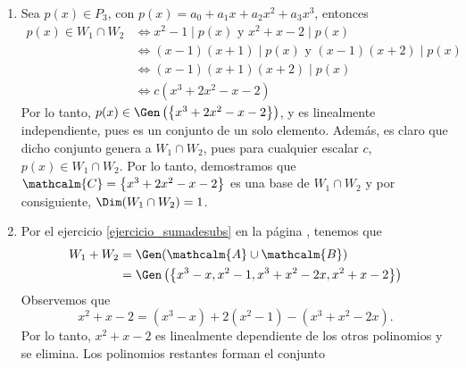 \begin{examplebox}{}{}
\begin{enumerate}[label=\alph*), topsep=6pt, itemsep=0pt]
\begin{align*}
            & \Longleftrightarrow p(x) = \left( x^2 + x - 2 \right) (ax + b) \\
            & \Longleftrightarrow p(x) = a\left( x^3 + x^2 - 2x \right) + b\left( x^2 + x - 2 \right)
        \end{align*}
        Por lo tanto, $p(x) \in \Gen \left(\left\{ x^3 + x^2 - 2x, x^2 + x - 2 \right\}\right)$, y como no existe un escalar $c$ tal que $x^3 + x^2 - 2x = c \left( x^2 + x - 2 \right)$, entonces el conjunto $\left\{ x^3 + x^2 - 2x, x^2 + x - 2 \right\}$ es linealmente independiente. Además, es claro que dicho conjunto genera a $W_2$, pues para cualquier $a$ y $b$, $p(x) \in W_2$. Por lo tanto, demostramos que $\mathcalm{B} = \left\{ x^3 + x^2 - 2x, x^2 + x - 2 \right\}$ es una base para $W_2$ y por consiguiente, tenemos que $\Dim W_2 = 2$.
        \item Sea $p(x) \in P_3$, con $p(x) = a_0 + a_1x + a_2x^2 + a_3x^3$, entonces
        \begin{align*}
            p(x) \in W_1 \cap W_2 & \Longleftrightarrow x^2 - 1 \mid p(x) \text{ y } x^2 + x - 2 \mid p(x) \\
            & \Longleftrightarrow (x - 1)(x + 1) \mid p(x) \text{ y } (x - 1)(x + 2) \mid p(x) \\
            & \Longleftrightarrow (x - 1)(x + 1)(x + 2) \mid p(x) \\
            & \Longleftrightarrow c \left( x^3 + 2x^2 - x - 2 \right)
        \end{align*}
        Por lo tanto, $p(x) \in \Gen \left(\left\{ x^3 + 2x^2 - x - 2 \right\}\right)$, y es linealmente independiente, pues es un conjunto de un solo elemento. Además, es claro que dicho conjunto genera a $W_1 \cap W_2$, pues para cualquier escalar $c$, $p(x) \in W_1 \cap W_2$. Por lo tanto, demostramos que $\mathcalm{C} = \left\{ x^3 + 2x^2 - x - 2 \right\}$ es una base de $W_1 \cap W_2$ y por consiguiente, $\Dim (W_1 \cap W_2) = 1$.
        \item Por el ejercicio \ref{ejercicio_sumadesubs} en la página \pageref{ejercicio_sumadesubs}, tenemos que
        \begin{align*}
            W_1 + W_2 & = \Gen(\mathcalm{A} \cup \mathcalm{B}) \\
            & = \Gen \left(\left\{ x^3 - x, x^2 - 1, x^3 + x^2 - 2x, x^2 + x - 2 \right\}\right)
        \end{align*}
        Observemos que
        $$x^2 + x - 2 = \left( x^3 - x \right) + 2\left( x^2 - 1 \right) - \left( x^3 + x^2 - 2x \right).$$
        Por lo tanto, $x^2 + x - 2$ es linealmente dependiente de los otros polinomios y se elimina. Los polinomios restantes forman el conjunto

\end{enumerate}
\end{examplebox}
